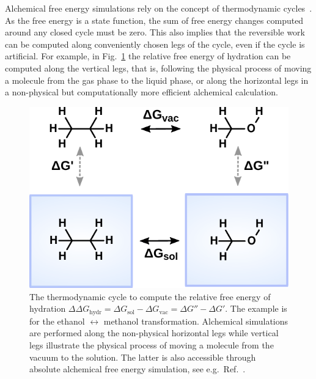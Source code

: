 \documentclass[journal=jctcce,manuscript=article]{achemso}
\begin{document}
Alchemical free energy simulations rely on the concept of thermodynamic 
cycles~\cite{Tembe1984281}.
As the free energy is a state function, the sum of free energy changes
computed around any closed cycle must be zero.  This also implies
that the reversible work can be computed along
conveniently chosen legs of the cycle, even if the cycle is artificial.  For example, in
Fig.~\ref{fig:thermocycle} the relative free energy of hydration can
be computed along the vertical legs, that is, following the physical
process of moving a molecule from the gas phase to the liquid phase,
or along the horizontal legs in a non-physical but computationally more
efficient alchemical calculation.

\begin{figure}[ht]
  \includegraphics[scale=1.0]{figures/thermocycle.pdf}
  \caption{The thermodynamic cycle to compute the relative free energy
    of hydration
    $\Delta\Delta G_{\mathrm{hydr}}=\Delta G_{\mathrm{sol}}-\Delta
    G_{\mathrm{vac}}=\Delta G'' - \Delta G'$.  The example is for the
    ethanol $\leftrightarrow$ methanol transformation.  Alchemical
    simulations are performed along the non-physical horizontal
    legs while vertical legs illustrate the physical process of moving a 
    molecule from the vacuum to the solution.  The latter is also accessible 
    through absolute alchemical free energy simulation, see e.g.\ 
    Ref.~.}
  \label{fig:thermocycle}
\end{figure}
\end{document}
